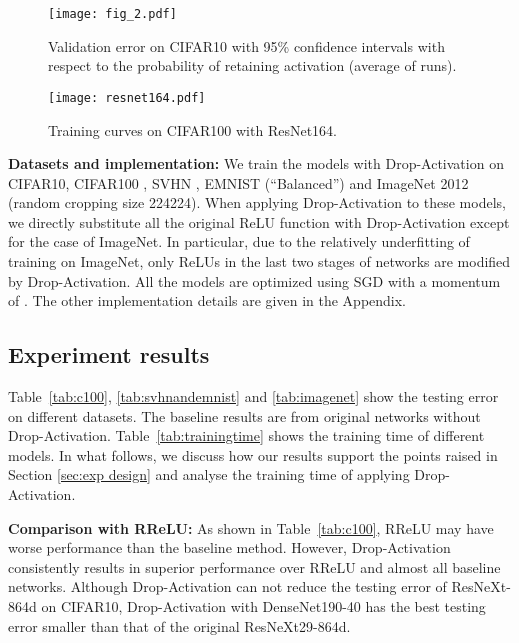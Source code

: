 \documentclass[11pt]{article}
\begin{document}
\begin{figure}
\centering
\begin{minipage}[t]{0.4\textwidth}
\vspace{0pt}
\texttt{[image: fig\_2.pdf]}
\caption{Validation error on CIFAR10 with 95\% confidence intervals with respect to the probability  of retaining activation (average of  runs).}
\label{fig:parameters}
\end{minipage}
\hspace{.3in}
\begin{minipage}[t]{0.4\textwidth}
\vspace{0pt}
\texttt{[image: resnet164.pdf]}
\caption{Training curves on CIFAR100 with ResNet164.}
\label{fig:resnet-164}
\end{minipage}

\vspace{-0.4cm}
\end{figure}

\noindent\textbf{Datasets and implementation:} We train the models with Drop-Activation on CIFAR10, CIFAR100 \cite{cifar}, SVHN \cite{svhn}, EMNIST (``Balanced'') \cite{emnist} and ImageNet 2012 \cite{ImageNet} (random cropping size 224224). When applying Drop-Activation to these models, we directly substitute all the original ReLU function with Drop-Activation except for the case of ImageNet. In particular, due to the relatively underfitting of training on ImageNet, only ReLUs in the last two stages of networks are modified by Drop-Activation. All the models are optimized using SGD with a momentum of  \cite{Sutskever:2013}. The other implementation details are given in the Appendix.

\subsection{Experiment results}
\label{subsec:result}
Table~\ref{tab:c100}, \ref{tab:svhnandemnist} and \ref{tab:imagenet} show the testing error on different datasets. The baseline results are from original networks without Drop-Activation. Table~\ref{tab:trainingtime} shows the training time of different models. In what follows, we discuss how our results support the points raised in Section \ref{sec:exp design} and analyse the training time of applying Drop-Activation.

\textbf{Comparison with RReLU: } As shown in Table~\ref{tab:c100}, RReLU may have worse performance than the baseline method. However, Drop-Activation consistently results in superior performance over RReLU and almost all baseline networks. Although Drop-Activation can not reduce the testing error of ResNeXt-864d on CIFAR10, Drop-Activation with DenseNet190-40 has the best testing error smaller than that of the original ResNeXt29-864d.
\end{document}

